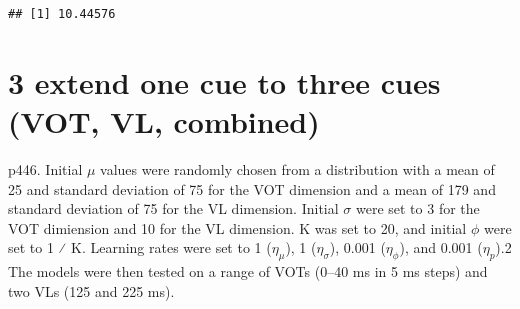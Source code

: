 \documentclass[
]{article}
\newenvironment{Shaded}{\begin{snugshade}}{\end{snugshade}}
\newcommand{\AttributeTok}[1]{\textcolor[rgb]{0.13,0.29,0.53}{#1}}
\newcommand{\CommentTok}[1]{\textcolor[rgb]{0.56,0.35,0.01}{\textit{#1}}}
\newcommand{\ConstantTok}[1]{\textcolor[rgb]{0.56,0.35,0.01}{#1}}
\newcommand{\ControlFlowTok}[1]{\textcolor[rgb]{0.13,0.29,0.53}{\textbf{#1}}}
\newcommand{\DecValTok}[1]{\textcolor[rgb]{0.00,0.00,0.81}{#1}}
\newcommand{\FunctionTok}[1]{\textcolor[rgb]{0.13,0.29,0.53}{\textbf{#1}}}
\newcommand{\NormalTok}[1]{#1}
\newcommand{\OtherTok}[1]{\textcolor[rgb]{0.56,0.35,0.01}{#1}}
\newcommand{\SpecialCharTok}[1]{\textcolor[rgb]{0.81,0.36,0.00}{\textbf{#1}}}
\begin{document}
\begin{Shaded}
\end{Shaded}

\begin{verbatim}
## [1] 10.44576
\end{verbatim}

\section{3 extend one cue to three cues (VOT, VL,
combined)}\label{extend-one-cue-to-three-cues-vot-vl-combined}

p446. Initial \(\mu\) values were randomly chosen from a distribution
with a mean of 25 and standard deviation of 75 for the VOT dimension and
a mean of 179 and standard deviation of 75 for the VL dimension. Initial
\(\sigma\) were set to 3 for the VOT dimiension and 10 for the VL
dimension. K was set to 20, and initial \(\phi\) were set to 1 ⁄ K.
Learning rates were set to 1 (\(\eta_\mu\)), 1 (\(\eta_\sigma\)), 0.001
(\(\eta_\phi\)), and 0.001 (\(\eta_p\)).2 The models were then tested on
a range of VOTs (0--40 ms in 5 ms steps) and two VLs (125 and 225 ms).
\end{document}
